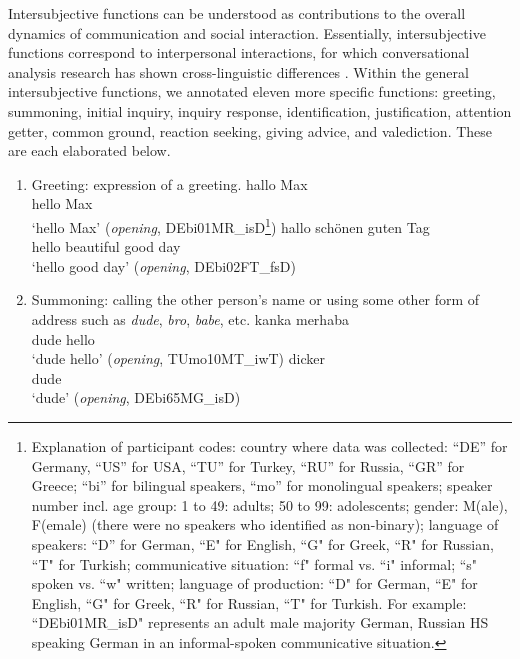 \documentclass[output=paper,colorlinks,citecolor=brown]{langscibook}
\begin{document}
\largerpage
\begin{sloppypar}
Intersubjective functions can be understood as contributions to the overall dynamics of communication and social interaction. Essentially, intersubjective functions correspond to interpersonal interactions, for which conversational analysis research has shown cross-linguistic differences \parencite[e.g.,][]{luke_telephonebook_2002}. Within the general intersubjective functions, we annotated eleven more specific functions: greeting, summoning, initial inquiry, inquiry response, identification, justification, attention getter, common ground, reaction seeking, giving advice, and valediction. These are each elaborated below.
\end{sloppypar}

\begin{enumerate}[label=(\alph*)]
    \item Greeting: expression of a greeting. 
    \ea \label{katsikaetal:onegreeting}
\gll hallo Max\\
     hello Max\\
\glt `hello Max' (\textit{opening}, DEbi01MR\_isD\footnote{Explanation of participant codes: country where data was collected: ``DE'' for Germany, ``US'' for USA, ``TU'' for Turkey, ``RU'' for Russia, ``GR'' for Greece; ``bi'' for bilingual speakers, ``mo'' for monolingual speakers; speaker number incl. age group: 1 to 49: adults; 50 to 99: adolescents; gender: M(ale), F(emale) (there were no speakers who identified as non-binary); language of speakers: ``D'' for German, ``E" for English, ``G" for Greek, ``R" for Russian, ``T" for Turkish; communicative situation: ``f" formal vs. ``i" informal; ``s" spoken  vs. ``w" written; language of production: ``D" for German, ``E" for English, ``G" for Greek, ``R" for Russian, ``T" for Turkish. For example: ``DEbi01MR\_isD" represents an adult male majority German, Russian HS speaking German in an informal-spoken communicative situation.})
\ex \label{katsikaetal:twogreeting}
\gll hallo schönen   guten Tag\\
     hello beautiful good  day\\
\glt `hello good day' (\textit{opening}, DEbi02FT\_fsD)
\z

\item Summoning: calling the other person’s name or using some other form of address such as \textit{dude}, \textit{bro}, \textit{babe}, etc. 
\ea \label{katsikaetal:threegreeting}
\gll kanka merhaba\\
     dude  hello\\
\glt `dude hello' (\textit{opening}, TUmo10MT\_iwT) 
\ex \label{katsikaetal:fourgreeting}
\gll dicker\\
     dude\\
\glt `dude' (\textit{opening}, DEbi65MG\_isD) 
\z


\end{enumerate}
\end{document}
